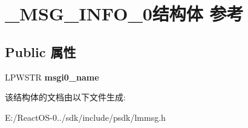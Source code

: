 \hypertarget{struct___m_s_g___i_n_f_o__0}{}\section{\+\_\+\+M\+S\+G\+\_\+\+I\+N\+F\+O\+\_\+0结构体 参考}
\label{struct___m_s_g___i_n_f_o__0}
\subsection*{Public 属性}
\begin{DoxyCompactItemize}
\item 
\mbox{\label{struct___m_s_g___i_n_f_o__0_aef772f95beb6e148f8f98d440fee0e60}} 
L\+P\+W\+S\+TR {\bfseries msgi0\+\_\+name}
\end{DoxyCompactItemize}


该结构体的文档由以下文件生成\+:\begin{DoxyCompactItemize}
\item 
E\+:/\+React\+O\+S-\/0../sdk/include/psdk/lmmsg.\+h\end{DoxyCompactItemize}
